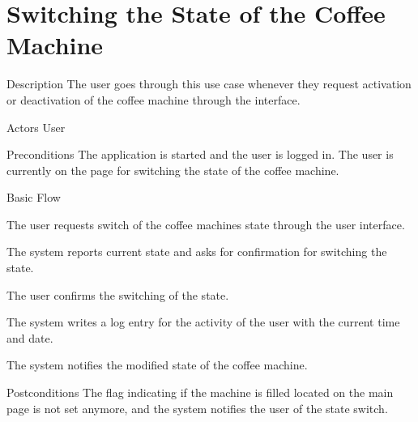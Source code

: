 \section{Switching the State of the Coffee Machine}

\begin{cpart}{Description}
The user goes through this use case whenever they request activation or deactivation of the coffee machine through the interface.
\end{cpart}

\begin{cpart}{Actors}
User
\end{cpart}

\begin{cpart}{Preconditions}
The application is started and the user is logged in. The user is currently on the page for switching the state of the coffee machine.
\end{cpart}

\begin{cpartList}{Basic Flow}
  \item The user requests switch of the coffee machines state through the user interface.
  \item The system reports current state and asks for confirmation for switching the state.
  \item The user confirms the switching of the state.
  \item The system writes a log entry for the activity of the user with the current time and date.
  \item The system notifies the modified state of the coffee machine.
\end{cpartList}

\begin{cpart}{Postconditions}
The flag indicating if the machine is filled located on the main page is not set anymore, and the system notifies the user of the state switch.
\end{cpart}

